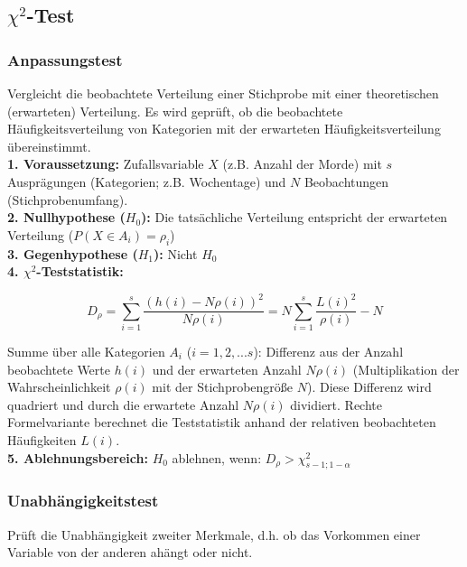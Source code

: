 \subsection{\(\chi^2\)-Test}

\subsubsection{Anpassungstest}

Vergleicht die beobachtete Verteilung einer Stichprobe mit 
einer theoretischen (erwarteten) Verteilung. Es wird geprüft, 
ob die beobachtete Häufigkeitsverteilung von Kategorien mit der 
erwarteten Häufigkeitsverteilung übereinstimmt.\\

\textbf{1. Voraussetzung:} Zufallsvariable \(X\) (z.B. Anzahl der Morde) mit \(s\) Ausprägungen 
(Kategorien; z.B. Wochentage) und \(N\) Beobachtungen (Stichprobenumfang).\\

\textbf{2. Nullhypothese (\(H_0\)):} Die tatsächliche Verteilung entspricht der erwarteten Verteilung (\(P(X \in A_i)=\rho_i\))\\

\textbf{3. Gegenhypothese (\(H_1\)):} Nicht \(H_0\)\\

\textbf{4. \(\chi^2\)-Teststatistik:}

\begin{equation*}
    D_{\rho} = \sum_{i=1}^{s}\frac{(h(i)-N\rho(i))^2}{N\rho(i)}=N\sum_{i=1}^{s}\frac{L(i)^2}{\rho(i)} - N
\end{equation*}

Summe über alle Kategorien \(A_i\) (\(i=1,2,...s\)): 
Differenz aus der Anzahl beobachtete Werte \(h(i)\) und der 
erwarteten Anzahl \(N\rho(i)\) (Multiplikation der 
Wahrscheinlichkeit \(\rho(i)\) mit der Stichprobengröße 
\(N\)). Diese Differenz wird quadriert und durch die erwartete 
Anzahl \(N\rho(i)\) dividiert. Rechte Formelvariante berechnet
die Teststatistik anhand der relativen beobachteten Häufigkeiten \(L(i)\).\\

\textbf{5. Ablehnungsbereich:} \(H_0\) ablehnen, wenn:  \(D_{\rho} > \chi^2_{s-1;1-\alpha}\)\\


\subsubsection{Unabhängigkeitstest}

Prüft die Unabhängigkeit zweiter Merkmale, d.h. ob das Vorkommen einer Variable von der anderen ahängt oder nicht.